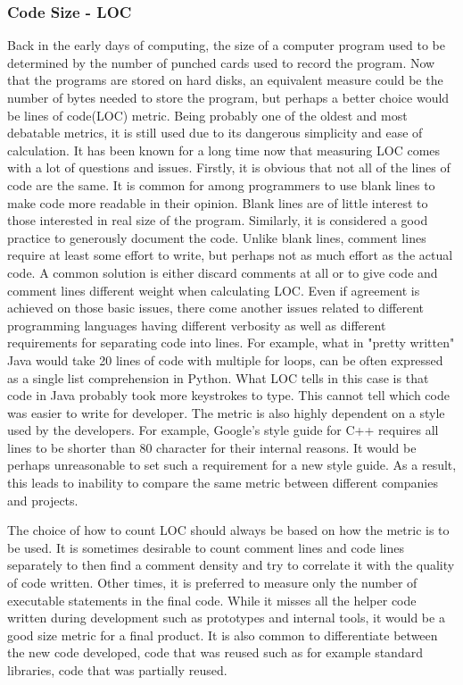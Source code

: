 \documentclass[11pt]{article}
\begin{document}
\subsubsection{Code Size - LOC}

\par
Back in the early days of computing, the size of a computer program used to be determined by the number of punched cards used to record the program.\cite{conte-et-al-1986} Now that the programs are stored on hard disks, an equivalent measure could be the number of bytes needed to store the program, but perhaps a better choice would be lines of code(LOC) metric. Being probably one of the oldest and most debatable metrics, it is still used due to its dangerous simplicity and ease of calculation. It has been known for a long time now that measuring LOC comes with a lot of questions and issues.\cite{conte-et-al-1986} Firstly, it is obvious that not all of the lines of code are the same. It is common for among programmers to use blank lines to make code more readable in their opinion. Blank lines are of little interest to those interested in real size of the program. Similarly, it is considered a good practice to generously document the code. Unlike blank lines, comment lines require at least some effort to write, but perhaps not as much effort as the actual code. A common solution is either discard comments at all or to give code and comment lines different weight when calculating LOC. Even if agreement is achieved on those basic issues, there come another issues related to different programming languages having different verbosity as well as different requirements for separating code into lines. For example, what in "pretty written" Java would take 20 lines of code with multiple for loops, can be often expressed as a single list comprehension in Python. What LOC tells in this case is that code in Java probably took more keystrokes to type. This cannot tell which code was easier to write for developer. The metric is also highly dependent on a style used by the developers. For example, Google's style guide for C++ requires all lines to be shorter than 80 character for their internal reasons.\cite{google-cpp-style-guide} It would be perhaps unreasonable to set such a requirement for a new style guide. As a result, this leads to inability to compare the same metric between different companies and projects.
\par
The choice of how to count LOC should always be based on how the metric is to be used. It is sometimes desirable to count comment lines and code lines separately to then find a comment density and try to correlate it with the quality of code written. Other times, it is preferred to measure only the number of executable statements in the final code. While it misses all the helper code written during development such as prototypes and internal tools, it would be a good size metric for a final product. It is also common to differentiate between the new code developed, code that was reused such as for example standard libraries, code that was partially reused.
\end{document}
